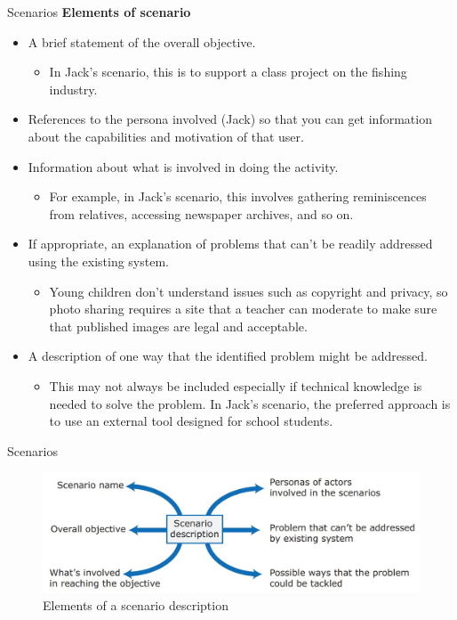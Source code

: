 \documentclass{beamer}
\begin{document}
\begin{frame}{Scenarios}
		\textbf{Elements of scenario}
	\begin{itemize}
		\item A brief statement of the overall objective.
		\begin{itemize}
			\item  In Jack’s scenario, this is to support a class project on the fishing industry.
		\end{itemize}
		\item References to the persona involved (Jack) so that you can get information 
		about the capabilities and motivation of that user.
		\item Information about what is involved in doing the activity.
		\begin{itemize}
			\item For example, 
			in Jack’s scenario, this involves gathering reminiscences from relatives, 
			accessing newspaper archives, and so on.
		\end{itemize} 
		\item If appropriate, an explanation of problems that can’t be readily 
		addressed using the existing system.
		\begin{itemize}
			\item  Young children don’t understand issues such as copyright and privacy, so photo sharing requires a site 
			that a teacher can moderate to make sure that published images are legal 
			and acceptable.
		\end{itemize}
		\item A description of one way that the identified problem might be addressed. 
		\begin{itemize}
			\item This may not always be included especially if technical knowledge is 
			needed to solve the problem. In Jack’s scenario, the preferred approach 
			is to use an external tool designed for school students.
		\end{itemize}
		
	\end{itemize}
	
\end{frame}
\begin{frame}{Scenarios}
	\begin{figure}
		\includegraphics[scale=.5]{img/m2_24.jpg}
		\caption{Elements of a scenario description}
	\end{figure}
	
\end{frame}
\end{document}
